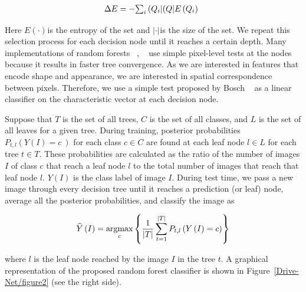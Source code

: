 \documentclass{article}
\begin{document}
\let\saveeqnno\theequation
\let\savefrac\frac
\def\dispfrac{\displaystyle\savefrac}
\begin{eqnarray}
\let\frac\dispfrac
\gdef\theequation{2}
\let\theHequation\theequation
\label{disp-formula-group-d27d73835da3454a817782924579e245}
\begin{array}{@{}l}\Delta E=-{\sum_i{\frac{\left(Q_i\right\vert}{\left(Q\right\vert}E\left(Q_i\right)}}\end{array}
\end{eqnarray}
\global\let\theequation\saveeqnno
\addtocounter{equation}{-1}\ignorespaces

Here $E\left(\cdot\right) $\ensuremath{_{}}is the entropy of the set and $\left\vert \cdot\right\vert $\ensuremath{_{}}is the size of the set. We repeat this selection process for each decision node until it reaches a certain depth. Many implementations of random forests \unskip~\cite{1641075:26775846}, \unskip~\cite{1641075:26775849} use simple pixel-level tests at the nodes because it results in faster tree convergence. As we are interested in features that encode shape and appearance, we are interested in spatial correspondence between pixels. Therefore, we use a simple test proposed by Bosch \unskip~\cite{1641075:26775861} {\textemdash} as a linear classifier on the characteristic vector {\textemdash} at each decision node.

Suppose that $T $ is the set of all trees, $C $ is the set of all classes, and $L $ is the set of all leaves for a given tree. During training, posterior probabilities $P_{t,l}\left(Y\left(I\right)=c\:\right) $ for each class $c\in C $ are found at each leaf node $l\in L $ for each tree $t\in T $. These probabilities are calculated as the ratio of the number of images $I $ of class $c $ that reach a leaf node $l $ to the total number of images that reach that leaf node $l $. $Y\left(I\right) $ is the class label of image $I $. During test time, we pass a new image through every decision tree until it reaches a prediction (or leaf) node, average all the posterior probabilities, and classify the image as


\begin{eqnarray}
\gdef\theequation{3}
\label{disp-formula-group-032e1395024b44bca0feeb46474c0adc}
\widehat Y\left(I\right)=\underset c{\text{argmax}}\left\{\frac1{\left\vert T\right\vert}\sum_{t=1}^{\left\vert T\right\vert}P_{t,l}\left(Y\left(I\right)=c\right)\right\}
\end{eqnarray}


where $l $ is the leaf node reached by the image $I $ in the tree $t $. A graphical representation of the proposed random forest classifier is shown in Figure~\ref{Drive-Net/figure2}  (see the right side).
\end{document}
